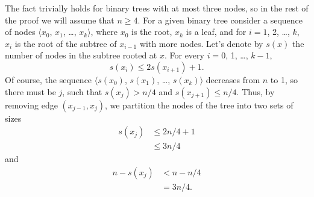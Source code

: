 \subproblem
The fact trivially holds for binary trees with at most three nodes, so in the rest of the proof we will assume that $n\ge4$.
For a given binary tree consider a sequence of nodes $\langle x_0$, $x_1$, \dots, $x_k\rangle$, where $x_0$ is the root, $x_k$ is a leaf, and for $i=1$, 2, \dots, $k$, $x_i$ is the root of the subtree of $x_{i-1}$ with more nodes.
Let's denote by $s(x)$ the number of nodes in the subtree rooted at $x$.
For every $i=0$, 1, \dots, $k-1$,
\[
    s(x_i) \le 2s(x_{i+1})+1.
\]
Of course, the sequence $\langle s(x_0)$, $s(x_1)$, \dots, $s(x_k)\rangle$ decreases from $n$ to 1, so there must be $j$, such that $s(x_j)>n/4$ and $s(x_{j+1})\le n/4$.
Thus, by removing edge $(x_{j-1},x_j)$, we partition the nodes of the tree into two sets of sizes
\begin{align*}
    s(x_j) &\le 2n/4+1 \\
    &\le 3n/4
\end{align*}
and
\begin{align*}
    n-s(x_j) &< n-n/4 \\
    &= 3n/4.
\end{align*}

